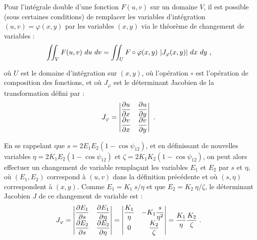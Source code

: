 \begin{refsection}
Pour l'intégrale double d'une fonction $F(u,v)$ sur un domaine $V$, il est possible (sous certaines conditions) de remplacer les variables d'intégration $(u,v)=\varphi(x,y)$ par les variables $(x,y)$ via le théorème de changement de variables \parencite{appel_2008} :
\begin{equation}
    \iint_V F(u,v) ~ du ~ dv = \iint_U F \circ \varphi(x,y) ~ |J_\varphi(x,y)| ~ dx ~ dy ~ \rm ,
    \label{eq:53-theoreme_changement_variable}
\end{equation}

où $U$ est le domaine d'intégration sur $(x,y)$, où l'opération $\circ$ est l'opération de composition des fonctions, et où $J_\varphi$ est le déterminant Jacobien de la transformation défini par :
\begin{equation}
J_\varphi = 
    \begin{vmatrix}
    \dfrac{\partial u}{\partial x}    & \dfrac{\partial u}{\partial y} \\
    \dfrac{\partial v}{\partial x}    & \dfrac{\partial v}{\partial y} \\
    \end{vmatrix} ~ \rm .
\end{equation}

En se rappelant que $s=2 E_1 E_2 (1-\cos{\psi_{12}})$, et en définissant de nouvelles variables $\eta=2 K_1 E_2 (1-\cos{\psi_{12}})$ et $\zeta=2 K_1 K_2 (1-\cos{\psi_{12}})$, on peut alors effectuer un changement de variable remplaçant les variables $E_1$ et $E_2$ par $s$ et $\eta$, où $(E_1,E_2)$ correspond à $(u,v)$ dans la définition précédente et où $(s,\eta)$ correspondent à $(x,y)$. Comme $E_1= K_1 ~ s/\eta$ et que $E_2=K_2 ~ \eta/\zeta$, le déterminant Jacobien $J$ de ce changement de variable est :
\begin{equation}
J_\varphi = 
    \begin{vmatrix}
    \dfrac{\partial E_1}{\partial s}    & \dfrac{\partial E_1}{\partial \eta} \\
    \dfrac{\partial E_2}{\partial s}    & \dfrac{\partial E_2}{\partial \eta} \\
    \end{vmatrix}
    =
    \begin{vmatrix}
    \dfrac{K_1}{\eta}       			& -K_1\dfrac{s}{\eta^2} \\
    0               					& ~ \dfrac{K_2}{\zeta} \\
    \end{vmatrix}
    =\dfrac{K_1}{\eta} \dfrac{K_2}{\zeta} ~ \rm .
\end{equation}


\end{refsection}
